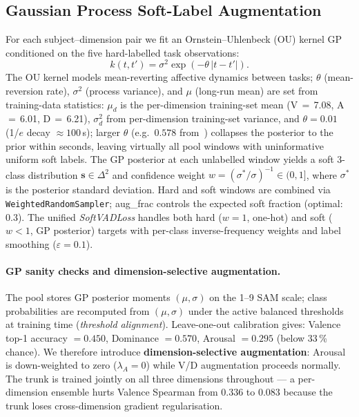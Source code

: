\documentclass[sigconf,nonacm]{acmart}
\begin{document}
\subsection{Gaussian Process Soft-Label Augmentation}
\label{sec:gp}

For each subject--dimension pair we fit an Ornstein--Uhlenbeck (OU) kernel
GP~\cite{rasmussen2006gaussian} conditioned on the five hard-labelled task
observations:
\begin{equation}
  k(t, t') = \sigma^2 \exp\!\left(-\theta\,|t - t'|\right).
\end{equation}
The OU kernel models mean-reverting affective dynamics between tasks;
$\theta$ (mean-reversion rate), $\sigma^2$ (process variance), and $\mu$
(long-run mean) are set from training-data statistics:
$\mu_d$ is the per-dimension training-set mean
(V\,$=$\,7.08, A\,$=$\,6.01, D\,$=$\,6.21),
$\sigma^2_d$ from per-dimension training-set variance,
and $\theta = 0.01$ (1/$e$ decay $\approx 100$\,s); larger $\theta$
(e.g.\ $0.578$ from~\citeauthor{meng2026moderating}) collapses the posterior
to the prior within seconds, leaving virtually all pool windows with
uninformative uniform soft labels.
The GP posterior at each unlabelled window yields a soft 3-class
distribution $\mathbf{s} \in \Delta^2$ and confidence weight
$w = (\sigma^* / \sigma)^{-1} \in (0,1]$, where $\sigma^*$ is the
posterior standard deviation.
Hard and soft windows are combined via \texttt{WeightedRandomSampler};
aug\_frac controls the expected soft fraction (optimal: 0.3).
The unified \emph{SoftVADLoss} handles both hard ($w=1$, one-hot) and
soft ($w < 1$, GP posterior) targets with per-class inverse-frequency
weights and label smoothing ($\varepsilon = 0.1$).

\paragraph{GP sanity checks and dimension-selective augmentation.}
The pool stores GP posterior moments $(\mu,\sigma)$ on the 1--9 SAM scale;
class probabilities are recomputed from $(\mu,\sigma)$ under the active
balanced thresholds at training time (\emph{threshold alignment}).
Leave-one-out calibration gives: Valence top-1 accuracy $=0.450$, Dominance
$=0.570$, Arousal $=0.295$ (below 33\,\% chance).
We therefore introduce \textbf{dimension-selective augmentation}: Arousal
is down-weighted to zero ($\lambda_A{=}0$) while V/D augmentation proceeds
normally.
The trunk is trained jointly on all three dimensions throughout --- a
per-dimension ensemble hurts Valence Spearman from $0.336$ to $0.083$
because the trunk loses cross-dimension gradient regularisation.
\end{document}
